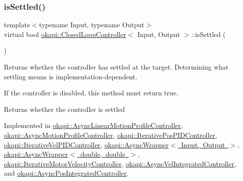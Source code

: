 \mbox{\label{classokapi_1_1ClosedLoopController_aed7aa0e94b6474c28314f8517d6cb4d8}} 
\subsubsection{\texorpdfstring{isSettled()}{isSettled()}}
{\footnotesize\ttfamily template$<$typename Input, typename Output$>$ \\
virtual bool \mbox{\hyperlink{classokapi_1_1ClosedLoopController}{okapi\+::\+Closed\+Loop\+Controller}}$<$ Input, Output $>$\+::is\+Settled (\begin{DoxyParamCaption}{ }\end{DoxyParamCaption})\hspace{0.3cm}{\ttfamily [pure virtual]}}

Returns whether the controller has settled at the target. Determining what settling means is implementation-\/dependent.

If the controller is disabled, this method must return {\ttfamily true}.

\begin{DoxyReturn}{Returns}
whether the controller is settled 
\end{DoxyReturn}


Implemented in \mbox{\hyperlink{classokapi_1_1AsyncLinearMotionProfileController_aecfed2c6a0ead2c38253250e26ce17d4}{okapi\+::\+Async\+Linear\+Motion\+Profile\+Controller}}, \mbox{\hyperlink{classokapi_1_1AsyncMotionProfileController_abfc944ba6d703dc1aa6fb16a44b5e395}{okapi\+::\+Async\+Motion\+Profile\+Controller}}, \mbox{\hyperlink{classokapi_1_1IterativePosPIDController_a856b633717128607fa8f1b52d91f89d6}{okapi\+::\+Iterative\+Pos\+P\+I\+D\+Controller}}, \mbox{\hyperlink{classokapi_1_1IterativeVelPIDController_a818347e199d8e7fd3e11f9f1aa369749}{okapi\+::\+Iterative\+Vel\+P\+I\+D\+Controller}}, \mbox{\hyperlink{classokapi_1_1AsyncWrapper_a93343937a8bbe762aeb6460197a22dfe}{okapi\+::\+Async\+Wrapper$<$ Input, Output $>$}}, \mbox{\hyperlink{classokapi_1_1AsyncWrapper_a93343937a8bbe762aeb6460197a22dfe}{okapi\+::\+Async\+Wrapper$<$ double, double $>$}}, \mbox{\hyperlink{classokapi_1_1IterativeMotorVelocityController_ade18c38b1ec3196b25b0ea323d8e1075}{okapi\+::\+Iterative\+Motor\+Velocity\+Controller}}, \mbox{\hyperlink{classokapi_1_1AsyncVelIntegratedController_a8518d706827ccc8d42d0a401566d58f7}{okapi\+::\+Async\+Vel\+Integrated\+Controller}}, and \mbox{\hyperlink{classokapi_1_1AsyncPosIntegratedController_a21b7ee29d335ee33aed1c41969a27f62}{okapi\+::\+Async\+Pos\+Integrated\+Controller}}.

